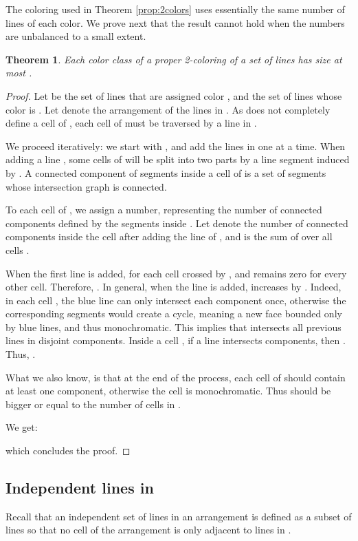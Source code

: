 \documentclass[11pt,a4paper]{article}
\newtheorem{theorem}{Theorem}
\begin{document}
The coloring used in Theorem \ref{prop:2colors} uses essentially the same number of lines of each color. We prove next that the result cannot hold when the numbers are unbalanced to a small extent.

\begin{theorem}
Each color class of a proper 2-coloring  of a set  of  lines has size at most .
\end{theorem}
\begin{proof}
Let  be the set of lines that are assigned color , and  the set of lines whose color is . Let  denote the arrangement of the lines in . As  does not completely define a cell of , each cell of  must be traversed by a line in .

We proceed iteratively: we start with , and add the lines in  one at a time. When adding a line , some cells of  will be split into two parts by a line segment induced by . A connected component of segments inside a cell of  is a set of segments whose intersection graph is connected.

To each cell  of , we assign a number, representing the number of connected components defined by the segments inside . Let  denote the number of connected components inside the cell  after adding the  line of , and  is the sum of  over all cells .

When the first line  is added,  for each cell  crossed by , and remains zero for every other cell. Therefore, . In general, when the  line  is added,  increases by . Indeed, in each cell , the blue line can only intersect each component once, otherwise the corresponding segments would create a cycle, meaning a new face bounded only by blue lines, and thus monochromatic. This implies that  intersects all previous  lines in  disjoint components. Inside a cell , if a line  intersects  components, then . Thus, .

What we also know, is that at the end of the process, each cell of  should contain at least one component, otherwise the cell is monochromatic. Thus  should be bigger or equal to the number of cells in .

We get:


\noindent which concludes the proof.
\end{proof}

\subsection{Independent lines in }\label{sec_indep}

Recall that an independent set of lines in an arrangement is defined as a subset of lines  so that no cell of the arrangement is only adjacent to lines in .
\end{document}
